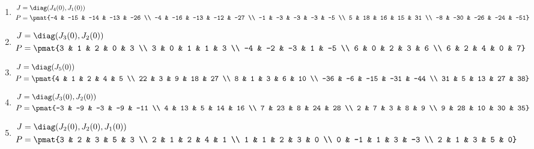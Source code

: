 \begin{enumerate}
\item

\begin{align*}
J &= \diag(J_{4}(0), J_{1}(0))\\
P &= \pmat{-4 & -15 & -14 & -13 & -26 \\ -4 & -16 & -13 & -12 & -27 \\ -1 & -3 & -3 & -3 & -5 \\ 5 & 18 & 16 & 15 & 31 \\ -8 & -30 & -26 & -24 & -51}
\end{align*}

\item

\begin{align*}
J &= \diag(J_{3}(0), J_{2}(0))\\
P &= \pmat{3 & 1 & 2 & 0 & 3 \\ 3 & 0 & 1 & 1 & 3 \\ -4 & -2 & -3 & 1 & -5 \\ 6 & 0 & 2 & 3 & 6 \\ 6 & 2 & 4 & 0 & 7}
\end{align*}

\item

\begin{align*}
J &= \diag(J_{5}(0))\\
P &= \pmat{4 & 1 & 2 & 4 & 5 \\ 22 & 3 & 9 & 18 & 27 \\ 8 & 1 & 3 & 6 & 10 \\ -36 & -6 & -15 & -31 & -44 \\ 31 & 5 & 13 & 27 & 38}
\end{align*}

\item

\begin{align*}
J &= \diag(J_{3}(0), J_{2}(0))\\
P &= \pmat{-3 & -9 & -3 & -9 & -11 \\ 4 & 13 & 5 & 14 & 16 \\ 7 & 23 & 8 & 24 & 28 \\ 2 & 7 & 3 & 8 & 9 \\ 9 & 28 & 10 & 30 & 35}
\end{align*}

\item

\begin{align*}
J &= \diag(J_{2}(0), J_{2}(0), J_{1}(0))\\
P &= \pmat{3 & 2 & 3 & 5 & 3 \\ 2 & 1 & 2 & 4 & 1 \\ 1 & 1 & 2 & 3 & 0 \\ 0 & -1 & 1 & 3 & -3 \\ 2 & 1 & 3 & 5 & 0}
\end{align*}


\end{enumerate}

